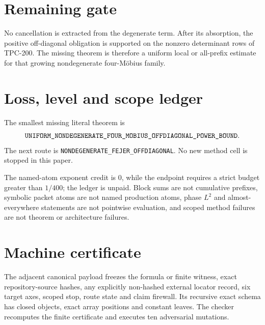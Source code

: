 \documentclass[11pt]{article}
\begin{document}
\section{Remaining gate}
No cancellation is extracted from the degenerate term.  After its absorption,
the positive off-diagonal obligation is supported on the nonzero determinant
rows of TPC-200.  The missing theorem is therefore a uniform local or
all-prefix estimate for that growing nondegenerate four-M\"obius family.


\section{Loss, level and scope ledger}
The smallest missing literal theorem is
\[
\texttt{UNIFORM\_\allowbreak{}NONDEGENERATE\_\allowbreak{}FOUR\_\allowbreak{}MOBIUS\_\allowbreak{}OFFDIAGONAL\_\allowbreak{}POWER\_\allowbreak{}BOUND}.
\]
The next route is \texttt{NONDEGENERATE\_\allowbreak{}FEJER\_\allowbreak{}OFFDIAGONAL}.
No new method cell is stopped in this paper.

The named-atom exponent credit is \(0\), while the endpoint requires a
strict budget greater than \(1/400\); the ledger is unpaid.  Block sums are
not cumulative prefixes, symbolic packet atoms are not named production
atoms, phase \(L^2\) and almost-everywhere statements are not pointwise
evaluation, and scoped method failures are not theorem or architecture
failures.

\section{Machine certificate}
The adjacent canonical payload freezes the formula or finite witness,
exact repository-source hashes, any explicitly non-hashed external locator
record, six target axes, scoped stop, route state and claim firewall.  Its
recursive exact schema has closed objects, exact array positions and
constant leaves.  The checker recomputes the finite certificate and executes
ten adversarial mutations.



\end{document}
